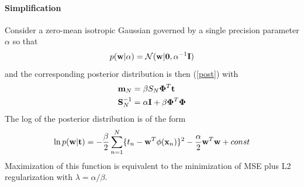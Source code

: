 \documentclass[11pt]{article}
\numberwithin{equation}{section}
\newcommand{\dm}[0]{\mathbf{\Phi}}
\begin{document}
\paragraph{Simplification}
Consider a zero-mean isotropic Gaussian governed by a single precision parameter $\alpha$ so that
\begin{equation}
	p(\textbf{w}|\alpha) = \mathcal{N}(\textbf{w}|\textbf{0}, \alpha^{-1}\textbf{I})
\end{equation}
and the corresponding posterior distribution is then (\ref{post}) with
\begin{align}
	\vm_N &= \beta S_N\dm^T\vt\\
	\tb{S}_N^{-1} &= \alpha\tb{I} + \beta \mathbf{\Phi}^T\mathbf{\Phi}
\end{align}
The log of the posterior distribution is of the form
\begin{equation}
	\ln p(\textbf{w}|\textbf{t}) = -\frac{\beta}{2}\sum_{n=1}^N\{t_n - \textbf{w}^T\phi(\textbf{x}_n)\}^2 - \frac{\alpha}{2}\textbf{w}^T\textbf{w} + const
\end{equation}
Maximization of this function is equivalent to the minimization of MSE plus L2 regularization with $\lambda = \alpha / \beta$.
\end{document}

